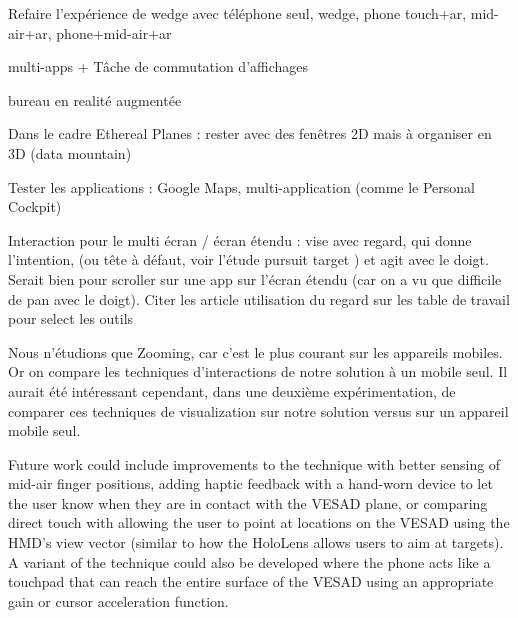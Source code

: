 Refaire l'expérience de wedge avec téléphone seul, wedge, phone touch+ar, mid-air+ar, phone+mid-air+ar

multi-apps + Tâche de commutation d'affichages

bureau en realité augmentée

Dans le cadre Ethereal Planes : rester avec des fenêtres 2D mais à organiser en 3D (data mountain)

Tester les applications : Google Maps, multi-application (comme le Personal Cockpit)

Interaction pour le multi écran / écran étendu : vise avec regard, qui donne l'intention, (ou tête à défaut, voir l'étude pursuit target \citep{Esteves2017}) et agit avec le doigt. Serait bien pour scroller sur une app sur l'écran étendu (car on a vu que difficile de pan avec le doigt). Citer les article utilisation du regard sur les table de travail pour select les outils

Nous n'étudions que Zooming, car c'est le plus courant sur les appareils mobiles. Or on compare les techniques d'interactions de notre solution à un mobile seul. Il aurait été intéressant cependant, dans une deuxième expérimentation, de comparer ces techniques de visualization sur notre solution versus sur un appareil mobile seul.

Future work could include improvements to the  technique with better sensing of mid-air finger positions, adding haptic feedback
with a hand-worn device to let the user know when they are in contact with the VESAD plane, or comparing direct touch with allowing the user to point at locations on the VESAD using the HMD's view vector (similar to how the HoloLens allows users to aim at targets). A variant of the  technique could also be developed where the phone acts like a touchpad that can reach the entire surface of the VESAD using an appropriate gain or cursor acceleration function.



